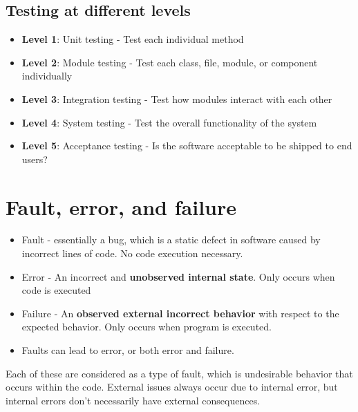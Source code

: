 \documentclass[12pt]{book}
\begin{document}
\subsection*{Testing at different levels}
\begin{itemize}
  \item \textbf{Level 1}: Unit testing - Test each individual method
  \item \textbf{Level 2}: Module testing - Test each class, file, module, or component individually
  \item \textbf{Level 3}: Integration testing - Test how modules interact with each other
  \item \textbf{Level 4}: System testing - Test the overall functionality of the system
  \item \textbf{Level 5}: Acceptance testing - Is the software acceptable to be shipped to end users?
\end{itemize}

\section*{Fault, error, and failure}
\begin{itemize}
  \item Fault - essentially a bug, which is a static defect in software caused by incorrect lines of code. No code execution necessary.
  \item Error - An incorrect and \textbf{unobserved internal state}. Only occurs when code is executed
  \item Failure - An \textbf{observed external incorrect behavior} with respect to the expected behavior. Only occurs when program is executed.
  \item Faults can lead to error, or both error and failure.
\end{itemize}

Each of these are considered as a type of fault, which is undesirable behavior that occurs within the code. External issues always occur due to internal error, but internal errors don't necessarily have external consequences.
\end{document}
